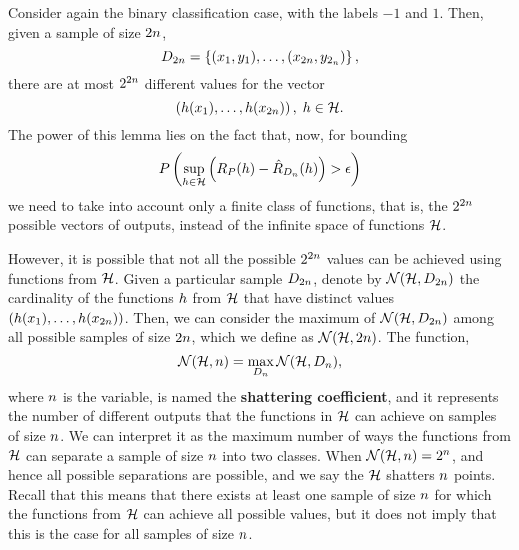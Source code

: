 %
Consider again the binary classification case, with the labels $-1$ and $1$. Then, given a sample of size $2 n$,
$$ D_{2n} = \left\{(x_1, y_1), \ldots, (x_{2 n}, y_{2_n})\right\} ,$$
there are at most $2^{2n}$ different values for the vector 
$$ \left(h(x_1), \ldots, h(x_{2 n})  \right), \; h \in \mathcal{H} .$$
%
The power of this lemma lies on the fact that, now, for bounding 
$$ P\left(\sup_{h \in \mathcal{H}} \left(R_P(h) - \hat{R}_{D_{n}}(h) \right) > \epsilon \right) $$
we need to take into account only a finite class of functions, that is, the $2^{2 n}$ possible vectors of outputs, instead of the infinite space of functions $\mathcal{H}$.
%

However, it is possible that not all the possible $2^{2 n}$ values can be achieved using functions from $\mathcal{H}$. Given a particular sample $D_{2 n}$, denote by $\mathcal{N}(\mathcal{H}, D_{2n})$ the cardinality of the functions $h$ from $\mathcal{H}$ that have distinct values $({h(x_1), \ldots, h(x_{2 n})})$. Then, we can consider the maximum of $\mathcal{N}(\mathcal{H}, D_{2n})$ among all possible samples of size $2 n$, which we define as $\mathcal{N}(\mathcal{H}, 2n)$.
%
The function, $$\mathcal{N}(\mathcal{H}, n) = \max_{D_n} \mathcal{N}(\mathcal{H}, D_{n}), $$ where $n$ is the variable, is named the \textbf{shattering coefficient}, and it represents the number of different outputs that the functions in $\mathcal{H}$ can achieve on samples of size $n$. We can interpret it as the maximum number of ways the functions from $\mathcal{H}$ can separate a sample of size $n$ into two classes.
%
When $\mathcal{N}(\mathcal{H}, n) = 2^n$, and hence all possible separations are possible, and we say the $\mathcal{H}$ shatters $n$ points. Recall that this means that there exists at least one sample of size $n$ for which the functions from $\mathcal{H}$ can achieve all possible values, but it does not imply that this is the case for all samples of size $n$.



